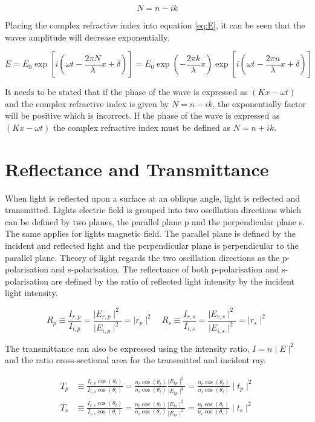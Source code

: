 \documentclass[MasterThesisMain.tex]{subfiles}
\begin{document}
\begin{equation}
N=n-ik
\end{equation}

Placing the complex refractive index into equation \ref{eq:E}, it can be seen that the waves amplitude will decrease exponentially.

\begin{equation}
E = E_0\exp[i(\omega t - \frac{2\pi N}{\lambda}x + \delta)] = E_0\exp(-\frac{2\pi k}{\lambda}x)\exp[i(\omega t - \frac{2\pi n}{\lambda}x + \delta)]
\end{equation}

It needs to be stated that if the phase of the wave is expressed as $(Kx-\omega t)$ and the complex refractive index is given by $N=n-ik$, the exponentially factor will be positive which is incorrect. If the phase of the wave is expressed as $(Kx-\omega t)$ the complex refractive index must be defined as $N=n+ik$.

\section{Reflectance and Transmittance}\label{ch:reflect/trans}
When light is reflected upon a surface at an oblique angle, light is reflected and transmitted. Lights electric field is grouped into two oscillation directions which can be defined by two planes, the parallel plane p and the perpendicular plane s. The same applies for lights magnetic field. The parallel plane is defined by the incident and reflected light and the perpendicular plane is perpendicular to the parallel plane. Theory of light regards the two oscillation directions as the p-polarisation and s-polarisation. The reflectance of both p-polarisation and s-polarisation are defined by the ratio of reflected light intensity by the incident light intensity.

\begin{equation}
R_{p} \equiv \frac{I_{r,p}}{I_{i,p}} = \frac{\mid E_{r,p} \mid^2}{\mid E_{i,p} \mid^2} = \mid r_{p} \mid^2 \quad R_{s} \equiv \frac{I_{r,s}}{I_{i,s}} = \frac{\mid E_{r,s} \mid^2}{\mid E_{i,s} \mid^2} = \mid r_{s} \mid^2
\end{equation}

The transmittance can also be expressed using the intensity ratio, $I = n \mid E \mid^2$ and the ratio cross-sectional area for the transmitted and incident ray.

\begin{align}
T_p &\equiv \frac{I_{r,p}\cos(\theta_t)}{I_{i,p}\cos(\theta_i)} = \frac{n_t\cos(\theta_t)}{n_i\cos(\theta_i)}\frac{\mid E_{tp} \mid^2}{\mid E_{ip} \mid^2} = \frac{n_t\cos(\theta_t)}{n_i\cos(\theta_i)} \mid t_{p} \mid^2\\
T_s &\equiv \frac{I_{r,s}\cos(\theta_t)}{I_{i,s}\cos(\theta_i)} = \frac{n_t\cos(\theta_t)}{n_i\cos(\theta_i)}\frac{\mid E_{ts} \mid^2}{\mid E_{is} \mid^2} = \frac{n_t\cos(\theta_t)}{n_i\cos(\theta_i)} \mid t_{s} \mid^2\\
\end{align}
\end{document}
